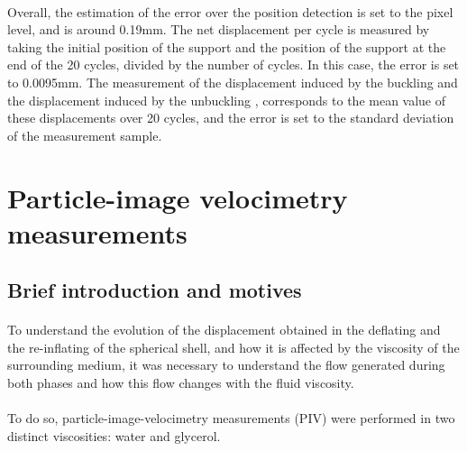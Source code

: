 \paragraph{}
Overall, the estimation of the error over the position detection is set to the pixel level, and is around 0.19mm. The net displacement per cycle is measured by taking the initial position of the support and the position of the support at the end of the 20 cycles, divided by the number of cycles. In this case, the error is set to 0.0095mm. The measurement of the displacement induced by the buckling and the displacement induced by the unbuckling , corresponds to the mean value of these displacements over 20 cycles, and the error is set to the standard deviation of the measurement sample.

\section{Particle-image velocimetry measurements}
\subsection{Brief introduction and motives}
\paragraph{}
To understand the evolution of the displacement obtained in the deflating and the re-inflating of the spherical shell, and how it is affected by the viscosity of the surrounding medium, it was necessary to understand the flow generated during both phases and how this flow changes with the fluid viscosity.
\paragraph{}
To do so, particle-image-velocimetry measurements (PIV) were performed in two distinct viscosities: water and glycerol.

